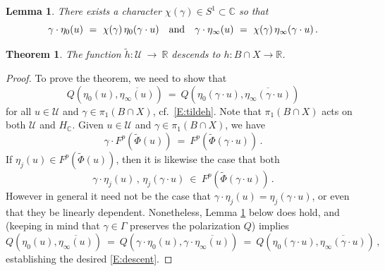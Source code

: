 \documentclass[10pt,a4paper]{amsart}
\newtheorem{theorem}{Theorem}
\newtheorem{lemma}{Lemma}
\def\bC{\mathbb{C}}
\def\bR{\mathbb{R}}
\def\cU{\mathcal{U}}
\def\tPhi{\tilde\Phi}
\def\tand{\quad\hbox{and}\quad}
\begin{document}
\begin{lemma} \label{L:char}
There exists a character $\chi(\gamma) \in S^1 \subset \bC$ so that
\[
  \gamma \cdot \eta_0(u) \ = \ \chi(\gamma)\,\eta_0(\gamma \cdot u)
  \tand 
  \gamma \cdot \eta_\infty(u) \ = \ 
  \chi(\gamma)\,\eta_\infty(\gamma \cdot u) \,.
\] 
\end{lemma}

\begin{theorem} \label{T:descent}
The function $\tilde h : \cU \ \to \ \bR$ descends to $h:B \cap X \to \bR$.
\end{theorem}

\begin{proof}
To prove the theorem, we need to show that 
\begin{equation}\label{E:descent} 
  Q\left(\eta_0(u) , \overline{\eta_\infty(u)}\right) \ = \ Q\left(\eta_0(\gamma\cdot u) , \overline{\eta_\infty(\gamma \cdot u)}\right)
\end{equation}
for all $u \in \cU$ and $\gamma \in \pi_1(B \cap X)$, cf.~\eqref{E:tildeh}.  Note that $\pi_1(B \cap X)$ acts on both $\cU$ and $H_\bC$.  Given $u \in \cU$ and $\gamma \in \pi_1(B \cap X)$, we have
\[
  \gamma \cdot F^p(\tPhi(u)) \ = \ F^p(\tPhi(\gamma\cdot u)) \,.
\]
If $\eta_j(u) \in F^p(\tPhi(u))$, then it is likewise the case that both
\begin{equation}\label{E:gamma.eta}
  \gamma\cdot \eta_j(u)\,,\, \eta_j(\gamma \cdot u) 
  \ \in \ 
  F^p(\tPhi(\gamma\cdot u)) \,.
\end{equation}
However in general it need not be the case that $\gamma\cdot \eta_j(u) =  \eta_j(\gamma \cdot u)$, or even that they be linearly dependent.  Nonetheless, Lemma \ref{L:char} below does hold, and (keeping in mind that $\gamma \in \Gamma$ preserves the polarization $Q$) implies
\[
  Q\left( \eta_0(u) , \overline{\eta_\infty(u)} \right) 
  \ = \ 
  Q\left( \gamma \cdot \eta_0(u) , \gamma \cdot \overline{\eta_\infty(u)} \right) 
  \ = \ 
  Q\left( \eta_0(\gamma \cdot u) , \overline{\eta_\infty(\gamma \cdot u)} \right) \,,
\]
establishing the desired \eqref{E:descent}.
\end{proof}
\end{document}
